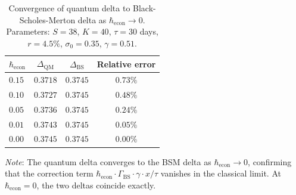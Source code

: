 \begin{table}[htbp]
\centering
\caption{Convergence of quantum delta to Black-Scholes-Merton delta as $\hbar_{\mathrm{econ}} \to 0$. Parameters: $S=38$, $K=40$, $\tau=30$ days, $r=4.5\%$, $\sigma_0=0.35$, $\gamma=0.51$.}
\label{tab:delta-convergence}
\begin{tabular}{lccc}
\hline
$\hbar_{\mathrm{econ}}$ & $\Delta_{\mathrm{QM}}$ & $\Delta_{\mathrm{BS}}$ & Relative error \\
\hline
$0.15$ & $0.3718$ & $0.3745$ & $0.73\%$ \\
$0.10$ & $0.3727$ & $0.3745$ & $0.48\%$ \\
$0.05$ & $0.3736$ & $0.3745$ & $0.24\%$ \\
$0.01$ & $0.3743$ & $0.3745$ & $0.05\%$ \\
$0.00$ & $0.3745$ & $0.3745$ & $0.00\%$ \\
\hline
\end{tabular}

\medskip
\footnotesize
\textit{Note}: The quantum delta converges to the BSM delta as $\hbar_{\mathrm{econ}} \to 0$, confirming that the correction term $\hbar_{\mathrm{econ}} \cdot \Gamma_{\mathrm{BS}} \cdot \gamma \cdot x/\tau$ vanishes in the classical limit. At $\hbar_{\mathrm{econ}}=0$, the two deltas coincide exactly.
\end{table}
